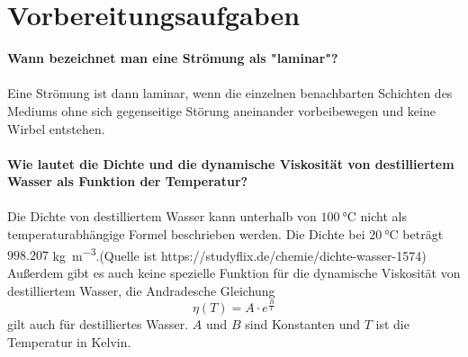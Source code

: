\section{Vorbereitungsaufgaben}
\label{sec:Vorbereitungsaufgaben}
\textbf{Wann bezeichnet man eine Strömung als "laminar"?}\\
\\
Eine Strömung ist dann laminar, wenn die einzelnen benachbarten Schichten 
des Mediums ohne sich gegenseitige Störung aneinander vorbeibewegen und 
keine Wirbel entstehen. \\ 
\\
%
\textbf{Wie lautet die Dichte und die dynamische Viskosität von 
destilliertem Wasser als Funktion der Temperatur?}\\
\\
Die Dichte von destilliertem Wasser kann unterhalb von  
$\SI{100}{\celsius}$ nicht als temperaturabhängige Formel 
beschrieben werden.
Die Dichte bei $\SI{20}{\celsius}$ beträgt $998.207$ 
\unit[per-mode=fraction]{\kilo\gram\per\meter\tothe{3}}.(Quelle ist https://studyflix.de/chemie/dichte-wasser-1574)\\
Außerdem gibt es auch keine spezielle Funktion für die dynamische
Viskosität von destilliertem Wasser, die Andradesche Gleichung 
\begin{equation}
 \eta (T) = A \cdot e^{\frac{B}{T}}
 \label{equ:AndradescheGleichung}
\end{equation} 
gilt auch für destilliertes Wasser. $A$ und $B$ sind Konstanten und $T$ ist die Temperatur in Kelvin. 
